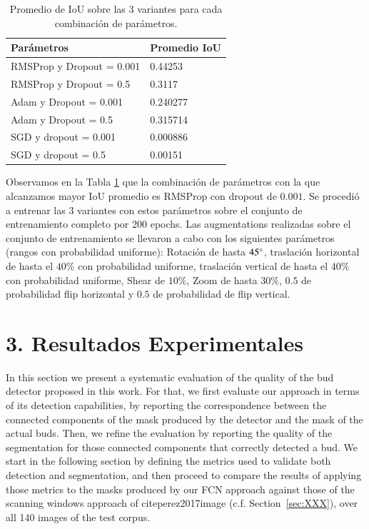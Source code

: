 \documentclass[a4paper,authoryear,review]{elsarticle}
\begin{document}
\begin{table}[]
	\begin{tabular}{ll}
		\hline
		\textbf{Parámetros} & \textbf{Promedio IoU} \\ \hline
		RMSProp y Dropout = 0.001 & 0.44253 \\
		RMSProp y Dropout = 0.5 & 0.3117 \\
		Adam y Dropout = 0.001 & 0.240277 \\
		Adam y Dropout = 0.5 & 0.315714 \\
		SGD y dropout = 0.001 & 0.000886 \\
		SGD y dropout = 0.5 & 0.00151 \\ \hline
	\end{tabular}
	\caption{Promedio de IoU sobre las 3 variantes para cada combinación de parámetros.}
	\label{tab:TablaX}
\end{table}

Observamos en la Tabla \ref{tab:TablaX} que la combinación de parámetros con la que alcanzamos mayor IoU promedio es RMSProp con dropout de $0.001$. Se procedió a entrenar las 3 variantes con estos parámetros sobre el conjunto de entrenamiento completo por 200 epochs. Las augmentations realizadas sobre el conjunto de entrenamiento se llevaron a cabo con los siguientes parámetros (rangos con probabilidad uniforme): Rotación de hasta $45\degree$, traslación horizontal de hasta el $40\%$ con probabilidad uniforme, traslación vertical de hasta el $40\%$ con probabilidad uniforme, Shear de $10\%$, Zoom de hasta $30\%$, $0.5$ de probabilidad flip horizontal y $0.5$ de probabilidad de flip vertical. 


\section{3. Resultados Experimentales} \label{results}

In this section we present a systematic evaluation of the quality of the bud detector proposed in this work. For that, we first evaluate our approach in terms of its detection capabilities, by reporting the correspondence between the connected components of the mask produced by the detector and the mask of the actual buds. Then, we refine the evaluation by reporting  the quality of the segmentation for those connected components that correctly detected a bud. We start in the following section by defining the metrics used to validate both detection and segmentation, and then proceed to compare the results of applying those metrics to the masks produced by our FCN approach against those of the scanning windows approach of cite{perez2017image} (c.f. Section~\ref{sec:XXX}), over all 140 images of the test corpus.
%
\end{document}
